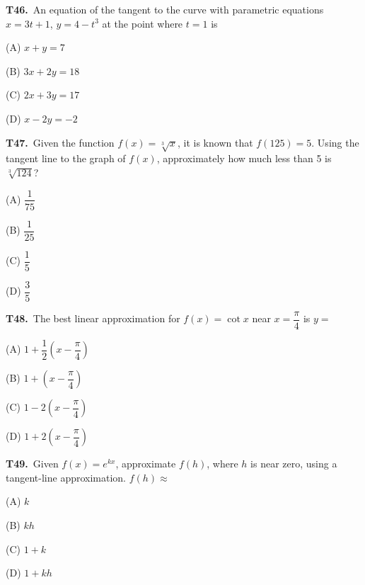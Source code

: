 \documentclass[11pt]{article}
\begin{document}
\bigskip\noindent\textbf{T46.}\ An equation of the tangent to the curve with parametric equations $x = 3t+1$, $y = 4-t^3$ at the point where $t=1$ is
\begin{list}{}{\setlength{\leftmargin}{3em}\setlength{\labelwidth}{2.5em}\setlength{\itemsep}{0pt}\setlength{\topsep}{2pt}}
\item[(A)] $x+y=7$
\item[(B)] $3x+2y=18$
\item[(C)] $2x+3y=17$
\item[(D)] $x-2y=-2$
\end{list}

\bigskip\noindent\textbf{T47.}\ Given the function $f(x) = \sqrt[3]{x}$, it is known that $f(125) = 5$. Using the tangent line to the graph of $f(x)$, approximately how much less than 5 is $\sqrt[3]{124}$?
\begin{list}{}{\setlength{\leftmargin}{3em}\setlength{\labelwidth}{2.5em}\setlength{\itemsep}{0pt}\setlength{\topsep}{2pt}}
\item[(A)] $\dfrac{1}{75}$
\item[(B)] $\dfrac{1}{25}$
\item[(C)] $\dfrac{1}{5}$
\item[(D)] $\dfrac{3}{5}$
\end{list}

\bigskip\noindent\textbf{T48.}\ The best linear approximation for $f(x) = \cot x$ near $x = \dfrac{\pi}{4}$ is $y=$
\begin{list}{}{\setlength{\leftmargin}{3em}\setlength{\labelwidth}{2.5em}\setlength{\itemsep}{0pt}\setlength{\topsep}{2pt}}
\item[(A)] $1 + \dfrac{1}{2}\left(x-\dfrac{\pi}{4}\right)$
\item[(B)] $1 + \left(x-\dfrac{\pi}{4}\right)$
\item[(C)] $1 - 2\left(x-\dfrac{\pi}{4}\right)$
\item[(D)] $1 + 2\left(x-\dfrac{\pi}{4}\right)$
\end{list}

\bigskip\noindent\textbf{T49.}\ Given $f(x) = e^{kx}$, approximate $f(h)$, where $h$ is near zero, using a tangent-line approximation. $f(h) \approx$
\begin{list}{}{\setlength{\leftmargin}{3em}\setlength{\labelwidth}{2.5em}\setlength{\itemsep}{0pt}\setlength{\topsep}{2pt}}
\item[(A)] $k$
\item[(B)] $kh$
\item[(C)] $1+k$
\item[(D)] $1+kh$
\end{list}
\end{document}
